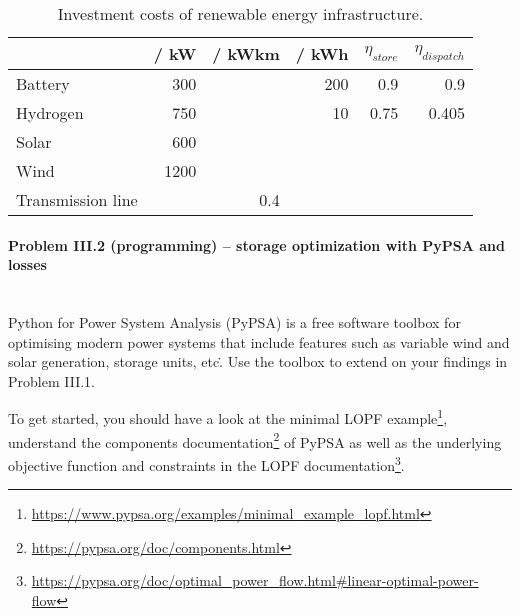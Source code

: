 \documentclass[11pt,a4paper,fleqn]{scrartcl}
\newcommand{\eur}{\text{\EUR{}}}
\begin{document}
\begin{table}[h]
 \centering
 \label{tab:prices}
 \begin{tabular}{@{}lrrrrr@{}}
  \toprule
                             & \eur / kW & \eur / kWkm & \eur / kWh & $\eta_{store}$ & $\eta_{dispatch}$ \\ \midrule
  Battery                    & 300         & & 200          & 0.9            & 0.9               \\
  Hydrogen                   & 750         & & 10           & 0.75           & 0.405              \\
  Solar                      & 600         & &              &                &                   \\
  Wind                       & 1200        & &              &                &                   \\
  Transmission line &          & 0.4 &              &                &                   \\ \bottomrule
 \end{tabular}
 \caption{Investment costs of renewable energy infrastructure.}
\end{table}

\newpage
\paragraph{Problem III.2 (programming) -- storage optimization with PyPSA and losses \faGroup}~\\

Python for Power System Analysis (PyPSA) is a free software toolbox for optimising modern power systems that include features such as variable wind and solar generation, storage units, etc\.. Use the toolbox to extend on your findings in Problem III.1.

To get started, you should have a look at the minimal LOPF example\footnote{\url{https://www.pypsa.org/examples/minimal_example_lopf.html}}, understand  the components documentation\footnote{\url{https://pypsa.org/doc/components.html}} of PyPSA as well as the underlying objective function and constraints in the LOPF documentation\footnote{\url{https://pypsa.org/doc/optimal_power_flow.html\#linear-optimal-power-flow}}.
\end{document}

